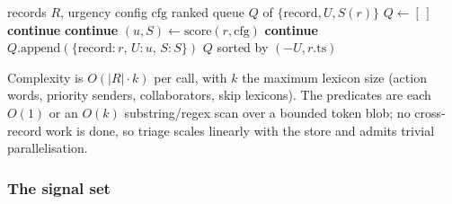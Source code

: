 \begin{algorithm}
\caption{Triage: filter, score, sort.}
\label{alg:triage}
\begin{algorithmic}[1]
\Require records $R$, urgency config $\mathrm{cfg}$
\Ensure ranked queue $Q$ of $\{\mathrm{record}, U, S(r)\}$
\State $Q \gets [\,]$
   \State \textbf{continue} \EndIf
   \State \textbf{continue} \EndIf
  \State $(u, S) \gets \mathrm{score}(r, \mathrm{cfg})$
   \State \textbf{continue} \EndIf
  \State $Q.\mathrm{append}(\{\mathrm{record}\!:\!r,\, U\!:\!u,\, S\!:\!S\})$
\EndFor
\State \Return $Q$ sorted by $(-U, r.\mathrm{ts})$
\end{algorithmic}
\end{algorithm}

Complexity is $O(|R| \cdot k)$ per call, with $k$ the maximum lexicon
size (action words, priority senders, collaborators, skip lexicons).
The predicates are each $O(1)$ or an $O(k)$ substring/regex scan over a
bounded token blob; no cross-record work is done, so triage scales
linearly with the store and admits trivial parallelisation.

\subsubsection{The signal set}

